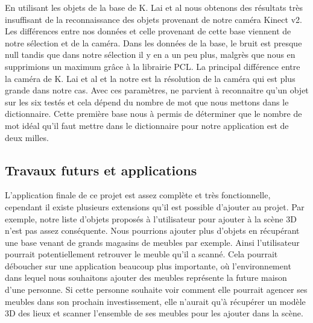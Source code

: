 En utilisant les objets de la base de K. Lai et al\cite{Base1} nous obtenons des résultats très insuffisant de la reconnaissance 
des objets provenant de notre caméra Kinect v2. Les différences entre nos données et celle provenant de cette base viennent
de notre sélection et de la caméra. Dans les données de la base, le bruit est presque null tandis que dans notre sélection il 
y en a un peu plus, malgrès que nous en supprimions un maximum grâce à la librairie PCL. La principal différence entre la caméra
de K. Lai et al\cite{Base1} et la notre est la résolution de la caméra qui est plus grande dans notre cas. Avec ces paramètres, ne parvient
à reconnaitre qu'un objet sur les six testés et cela dépend du nombre de mot que nous mettons dans le dictionnaire. Cette première base nous 
à permis de déterminer que le nombre de mot idéal qu'il faut mettre dans le dictionnaire pour notre application est de deux milles.\\

\subsection{Travaux futurs et applications}
L'application finale de ce projet est assez complète et très fonctionnelle, cependant il existe plusieurs extensions qu'il 
est possible d'ajouter au projet. Par exemple, notre liste d'objets proposés à l'utilisateur pour ajouter à la 
scène 3D n'est pas assez conséquente. Nous pourrions ajouter plus d'objets en récupérant une base venant de grands magasins
de meubles par exemple. Ainsi l'utilisateur pourrait potentiellement retrouver le meuble qu'il a scanné. Cela pourrait
déboucher sur une application beaucoup plus importante, où l'environnement dans lequel nous souhaitons ajouter des meubles
représente la future maison d'une personne. Si cette personne souhaite voir comment elle pourrait agencer ses meubles dans 
son prochain investissement, elle n'aurait qu'à récupérer un modèle 3D des lieux et scanner l'ensemble de ses meubles pour
les ajouter dans la scène.
